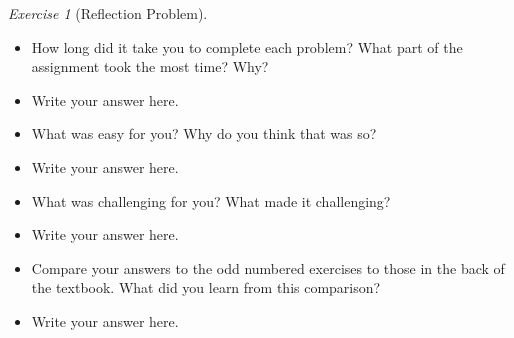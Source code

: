 \documentclass[12pt]{amsart}
\makeatletter
\theoremstyle{remark}
\newtheorem*{exercise}{Exercise}%
\renewenvironment{proof}[1][\proofname]{\par\doublespacing
  \pushQED{\qed}%
  \normalfont \topsep6\p@\@plus6\p@\relax
  \list{}{%
    \settowidth{\leftmargin}{\itshape\proofname:\hskip\labelsep}%
    \setlength{\labelwidth}{0pt}%
    \setlength{\itemindent}{-\leftmargin}%
  }%
  \item[\hskip\labelsep\itshape#1\@addpunct{:}]\ignorespaces
}{%
  \popQED\endlist\@endpefalse
  \singlespacing
}
\theoremstyle{mycomment}
\makeatother
\begin{document}
\begin{exercise}[Reflection Problem]

\begin{itemize}
\item How long did it take you to complete each problem? What part of the assignment took the most time? Why?
\begin{proof}[Response]
Write your answer here.
\end{proof}
\item What was easy for you? Why do you think that was so?
\begin{proof}[Response]
Write your answer here.
\end{proof}
\item What was challenging for you? What made it challenging?
\begin{proof}[Response]
Write your answer here.
\end{proof}
\item Compare your answers to the odd numbered exercises to those in the back of the textbook. What did you learn from this comparison?
\begin{proof}[Response]
Write your answer here.
\end{proof}
\end{itemize}

\end{exercise}













 
\end{document}
